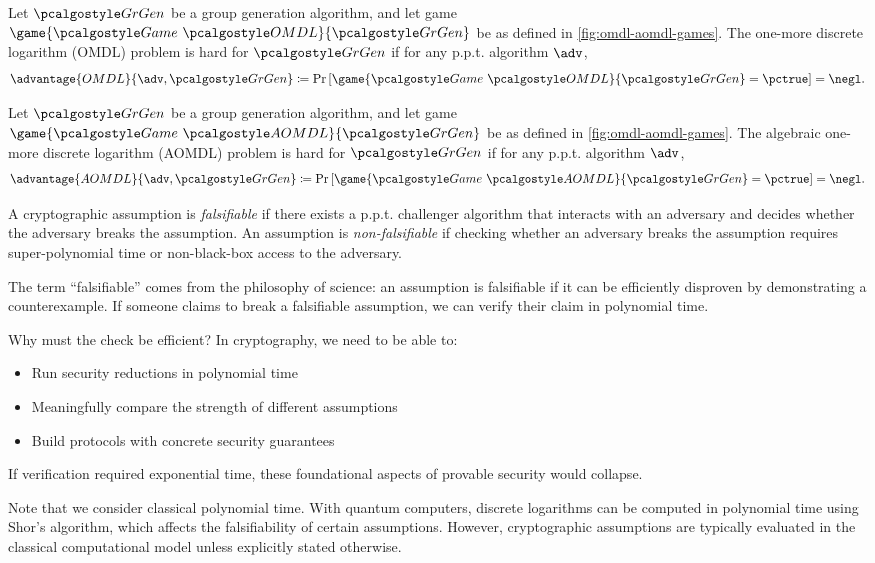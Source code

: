 \begin{definition}
  Let $\grgen$ be a group generation algorithm, and let game $\game{\Game~\algo{OMDL}}{\grgen}$ be as defined in \autoref{fig:omdl-aomdl-games}.
  The one-more discrete logarithm (OMDL) problem is hard for $\grgen$ if for any p.p.t. algorithm $\adv$,
  \[
  \advantage{OMDL}{\adv, \grgen} \defeq \pr{\game{\Game~\algo{OMDL}}{\grgen} = \pctrue} = \negl.
  \]
\end{definition}

\begin{definition}
  Let $\grgen$ be a group generation algorithm, and let game $\game{\Game~\algo{AOMDL}}{\grgen}$ be as defined in \autoref{fig:omdl-aomdl-games}.
  The algebraic one-more discrete logarithm (AOMDL) problem is hard for $\grgen$ if for any p.p.t. algorithm $\adv$,
  \[
  \advantage{AOMDL}{\adv, \grgen} \defeq \pr{\game{\Game~\algo{AOMDL}}{\grgen} = \pctrue} = \negl.
  \]
\end{definition}

\begin{definition}
  A cryptographic assumption is \emph{falsifiable} if there exists a p.p.t. challenger algorithm that interacts with an adversary and decides whether the adversary breaks the assumption.
  An assumption is \emph{non-falsifiable} if checking whether an adversary breaks the assumption requires super-polynomial time or non-black-box access to the adversary.
\end{definition}

\begin{remark}
  The term ``falsifiable'' comes from the philosophy of science: an assumption is falsifiable if it can be efficiently disproven by demonstrating a counterexample.
  If someone claims to break a falsifiable assumption, we can verify their claim in polynomial time.
  
  Why must the check be efficient? In cryptography, we need to be able to:
  \begin{itemize}
    \item Run security reductions in polynomial time
    \item Meaningfully compare the strength of different assumptions
    \item Build protocols with concrete security guarantees
  \end{itemize}
  If verification required exponential time, these foundational aspects of provable security would collapse.

  Note that we consider classical polynomial time. With quantum computers, discrete logarithms can be computed in polynomial time using Shor's algorithm, which affects the falsifiability of certain assumptions.
  However, cryptographic assumptions are typically evaluated in the classical computational model unless explicitly stated otherwise.
\end{remark}

